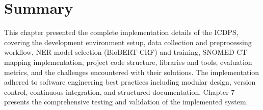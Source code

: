 \section*{Summary}
This chapter presented the complete implementation details of the ICDPS, covering the development environment setup, data collection and preprocessing workflow, NER model selection (BioBERT-CRF) and training, SNOMED CT mapping implementation, project code structure, libraries and tools, evaluation metrics, and the challenges encountered with their solutions. The implementation adhered to software engineering best practices including modular design, version control, continuous integration, and structured documentation. Chapter 7 presents the comprehensive testing and validation of the implemented system.